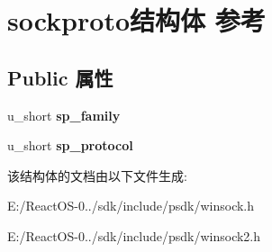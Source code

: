 \hypertarget{structsockproto}{}\section{sockproto结构体 参考}
\label{structsockproto}
\subsection*{Public 属性}
\begin{DoxyCompactItemize}
\item 
\mbox{\label{structsockproto_a6e799231abced5249b141fdf44d5163f}} 
u\+\_\+short {\bfseries sp\+\_\+family}
\item 
\mbox{\label{structsockproto_a0ab5e74d825158ac393793ee382021c3}} 
u\+\_\+short {\bfseries sp\+\_\+protocol}
\end{DoxyCompactItemize}


该结构体的文档由以下文件生成\+:\begin{DoxyCompactItemize}
\item 
E\+:/\+React\+O\+S-\/0../sdk/include/psdk/winsock.\+h\item 
E\+:/\+React\+O\+S-\/0../sdk/include/psdk/winsock2.\+h\end{DoxyCompactItemize}

